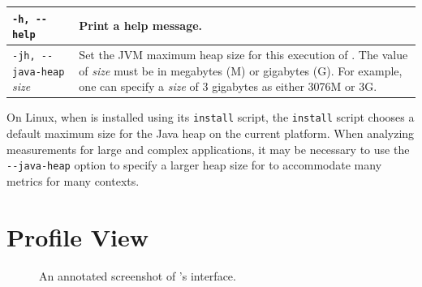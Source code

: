 \begin{centering}
\begin{tabular}{|l|p{4.1in}|}\hline\hline
 \verb|-h, --help|   &
 	Print a help message. \\\hline
 \verb|-jh, --java-heap| {\em size}  & 
  	Set the JVM maximum heap size for this execution of  \hpcviewer{}. The value of {\em size} must be 
	in megabytes (M) or gigabytes (G). For example, one can specify a {\em size}  of 3 gigabytes as either 
	3076M or 3G.\\\hline\hline
 \end{tabular}
 \end{centering}
 \vspace{2ex}

On Linux, when  \hpcviewer{}  is installed using its \verb|install| script, the \verb|install| script chooses a default maximum size for the Java heap on the current platform. When analyzing measurements for large and complex applications, it may be necessary to use the \verb|--java-heap| option to specify a larger heap size for  \hpcviewer{}  to accommodate many metrics for many contexts.




\section{Profile View}

\begin{figure}[t]
\caption{An annotated screenshot of \hpcviewer{}'s interface.}
\label{fig:hpcviewer-legend}
\end{figure}

